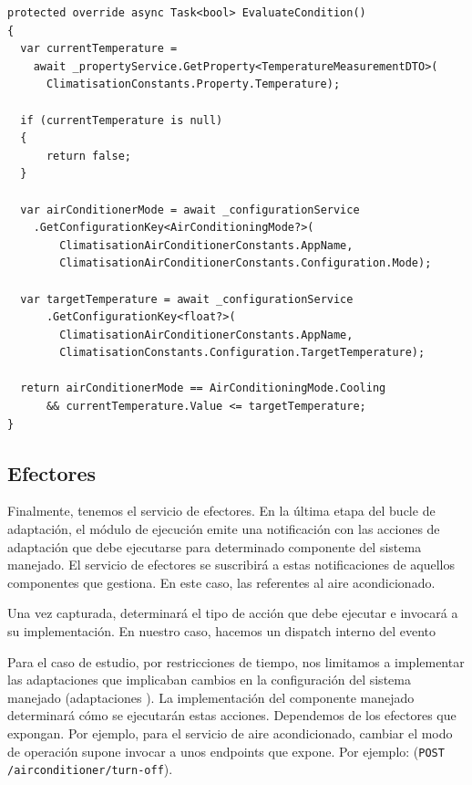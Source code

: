 \begin{lstlisting}[language={[Sharp]C},caption={Implementación de referencia del método \texttt{EvaluateCondition}. La regla obtiene del conocimiento el estado actual del sistema y determina si debe ejecutarse.},captionpos=b, label=ls:adaption-rule-evaluate-condition]
protected override async Task<bool> EvaluateCondition()
{
  var currentTemperature =
    await _propertyService.GetProperty<TemperatureMeasurementDTO>(
      ClimatisationConstants.Property.Temperature);

  if (currentTemperature is null)
  {
      return false;
  }

  var airConditionerMode = await _configurationService
    .GetConfigurationKey<AirConditioningMode?>(
        ClimatisationAirConditionerConstants.AppName,
        ClimatisationAirConditionerConstants.Configuration.Mode);

  var targetTemperature = await _configurationService
      .GetConfigurationKey<float?>(
        ClimatisationAirConditionerConstants.AppName,
        ClimatisationConstants.Configuration.TargetTemperature);

  return airConditionerMode == AirConditioningMode.Cooling
      && currentTemperature.Value <= targetTemperature;
}
\end{lstlisting}

\subsection{Efectores}

Finalmente, tenemos el servicio de efectores. En la última etapa del bucle de adaptación, el módulo de ejecución emite una notificación con las acciones de adaptación que debe ejecutarse para determinado componente del sistema manejado. El servicio de efectores se suscribirá a estas notificaciones de aquellos componentes que gestiona. En este caso, las referentes al aire acondicionado.

Una vez capturada, determinará el tipo de acción que debe ejecutar e invocará a su implementación. En nuestro caso, hacemos un dispatch interno del evento

Para el caso de estudio, por restricciones de tiempo, nos limitamos a implementar las adaptaciones que implicaban cambios en la configuración del sistema manejado (adaptaciones ). La implementación del componente manejado determinará cómo se ejecutarán estas acciones. Dependemos de los efectores que expongan. Por ejemplo, para el servicio de aire acondicionado, cambiar el modo de operación supone invocar a unos endpoints que expone. Por ejemplo: (\texttt{POST /airconditioner/turn-off}).

